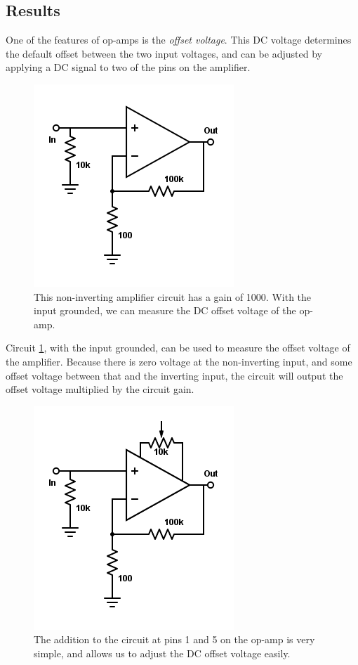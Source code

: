 \documentclass[11pt]{article}
\begin{document}
\subsection{Results}

One of the features of op-amps is the \emph{offset voltage}. This DC voltage determines the default offset between the two input voltages, and can be adjusted by applying a DC signal to two of the pins on the amplifier. \\

\begin{figure}[H]
    \centering
    \includegraphics[scale=0.5]{Diagrams/c-b1.png}
    \caption{This non-inverting amplifier circuit has a gain of 1000. With the input grounded, we can measure the DC offset voltage of the op-amp.}
    \label{circuit:b1}
\end{figure}

Circuit \ref{circuit:b1}, with the input grounded, can be used to measure the offset voltage of the amplifier. Because there is zero voltage at the non-inverting input, and some offset voltage between that and the inverting input, the circuit will output the offset voltage multiplied by the circuit gain.\\

\begin{figure}[H]
    \centering
    \includegraphics[scale=0.5]{Diagrams/c-b2.png}
    \caption{The addition to the circuit at pins 1 and 5 on the op-amp is very simple, and allows us to adjust the DC offset voltage easily.}
    \label{circuit:b2}
\end{figure}
\end{document}
